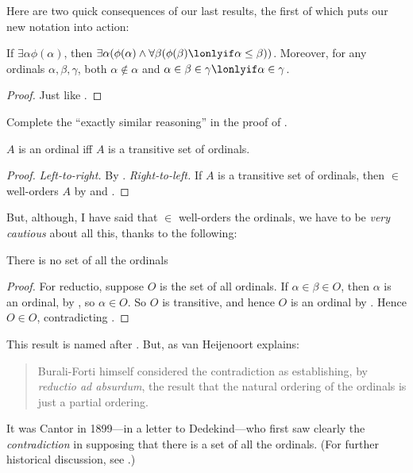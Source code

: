 \documentclass[../../../include/open-logic-section]{subfiles}
\begin{document}
Here are two quick consequences of our last results, the first of which puts our new notation into action:
\begin{cor}
	If $\exists \alpha\phi(\alpha)$, then $\exists \alpha(\phi(\alpha) \land \forall \beta(\phi(\beta) \lonlyif \alpha \leq \beta))$. Moreover, for any ordinals $\alpha, \beta, \gamma$, both $\alpha \notin \alpha$ and $\alpha \in \beta \in \gamma \lonlyif \alpha \in \gamma$. 
\end{cor}
\begin{proof}
	Just like .
\end{proof}
\begin{prob}
	Complete the ``exactly similar reasoning'' in the proof of .
\end{prob}\noindent
\begin{cor}
	$A$ is an ordinal iff $A$ is a transitive set of ordinals.
\end{cor}
\begin{proof}
	\emph{Left-to-right.} By . \emph{Right-to-left.} If $A$ is a transitive set of ordinals, then $\in$ well-orders $A$ by  and .
\end{proof}\noindent
But, although, I have said that $\in$ well-orders the ordinals, we have to be \emph{very cautious} about all this, thanks to the following:
\begin{thm} There is no set of all the ordinals
	\begin{proof}
		For reductio, suppose $O$ is the set of all ordinals. If $\alpha \in \beta \in O$, then $\alpha$ is an ordinal, by , so $\alpha \in O$. So $O$ is transitive, and hence $O$ is an ordinal by . Hence $O \in O$, contradicting . 
	\end{proof}
\end{thm}\noindent
This result is named after \citeauthor{Burali-Forti1897}. But, as van Heijenoort explains:
\begin{quote}
	Burali-Forti himself considered the contradiction as establishing, by \emph{reductio ad absurdum}, the result that the natural ordering of the ordinals is just a partial ordering. \citep[105]{Heijenoort1967}
\end{quote}
It was Cantor in 1899---in a letter to Dedekind---who first saw clearly the \emph{contradiction} in supposing that there is a set of all the ordinals. (For further historical discussion, see \citeauthor{Heijenoort1967} \citeyear[105]{Heijenoort1967}.)
\end{document}

